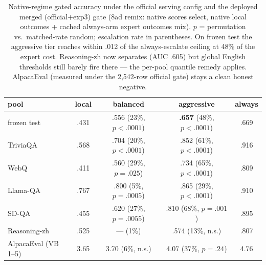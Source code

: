 \begin{table}[t]
\centering\small
\caption{Native-regime gated accuracy under the official serving
config and the deployed merged (official$+$exp3) gate (8ad remix:
native scores select, native local outcomes + cached always-arm
expert outcomes mix). $p$ = permutation vs.\ matched-rate random;
escalation rate in parentheses. On frozen test the aggressive tier
reaches within .012 of the always-escalate ceiling at 48\% of the
expert cost. Reasoning-zh now separates (AUC .605) but global
English thresholds still barely fire there --- the per-pool quantile
remedy applies. AlpacaEval (measured under the 2{,}542-row official
gate) stays a clean honest negative.}
\label{tab:native-validity}
\begin{tabular}{lcccc}
\toprule
pool & local & balanced & aggressive & always \\
\midrule
frozen test & .431 & .556 (23\%, $p{<}.0001$) & \textbf{.657} (48\%, $p{<}.0001$) & .669 \\
TriviaQA & .568 & .704 (20\%, $p{<}.0001$) & .852 (61\%, $p{<}.0001$) & .916 \\
WebQ & .411 & .560 (29\%, $p{=}.025$) & .734 (65\%, $p{<}.0001$) & .809 \\
Llama-QA & .767 & .800 (5\%, $p{=}.0005$) & .865 (29\%, $p{<}.0001$) & .910 \\
SD-QA & .455 & .620 (27\%, $p{=}.0055$) & .810 (68\%, $p{=}.001$) & .895 \\
Reasoning-zh & .525 & --- (1\%) & .574 (13\%, n.s.) & .807 \\
AlpacaEval (VB 1--5) & 3.65 & 3.70 (6\%, n.s.) & 4.07 (37\%, $p{=}.24$) & 4.76 \\
\bottomrule
\end{tabular}
\end{table}

